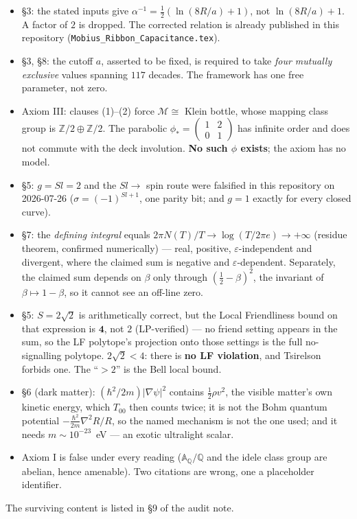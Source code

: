 \documentclass[11pt, a4paper, twocolumn]{article}
\theoremstyle{plain}
\theoremstyle{definition}
\begin{document}
\begin{tcolorbox}[colback=red!4!white, colframe=red!60!black, breakable,
  title=\textbf{Archival status --- read before citing}]
\begin{itemize}\itemsep2pt
\item \S3: the stated inputs give $\alpha^{-1} = \tfrac12(\ln(8R/a)+1)$, not
  $\ln(8R/a)+1$. A factor of $2$ is dropped. The corrected relation is already
  published in this repository (\texttt{Mobius\_Ribbon\_Capacitance.tex}).
\item \S3, \S8: the cutoff $a$, asserted to be fixed, is required to take
  \emph{four mutually exclusive} values spanning $117$ decades. The framework has
  one free parameter, not zero.
\item Axiom III: clauses (1)--(2) force $\mathcal{M}\cong$ Klein bottle, whose
  mapping class group is $\mathbb{Z}/2\oplus\mathbb{Z}/2$. The parabolic
  $\phi_*=\left(\begin{smallmatrix}1&2\\0&1\end{smallmatrix}\right)$ has infinite
  order and does not commute with the deck involution. \textbf{No such $\phi$ exists};
  the axiom has no model.
\item \S5: $g = Sl = 2$ and the $Sl\!\to\!$ spin route were falsified in this
  repository on 2026-07-26 ($\sigma=(-1)^{Sl+1}$, one parity bit; and $g=1$
  exactly for every closed curve).
\item \S7: the \emph{defining integral} equals $2\pi N(T)/T\to\log(T/2\pi e)\to
  +\infty$ (residue theorem, confirmed numerically) --- real, positive,
  $\varepsilon$-independent and divergent, where the claimed sum is negative and
  $\varepsilon$-dependent. Separately, the claimed sum depends on $\beta$ only
  through $(\tfrac12-\beta)^2$, the invariant of $\beta\mapsto1-\beta$, so it cannot
  see an off-line zero.
\item \S5: $S=2\sqrt2$ is arithmetically correct, but the Local Friendliness bound
  on that expression is $\mathbf{4}$, not $2$ (LP-verified) --- no friend setting
  appears in the sum, so the LF polytope's projection onto those settings is the
  full no-signalling polytope. $2\sqrt2<4$: there is \textbf{no LF violation}, and
  Tsirelson forbids one. The ``$>2$'' is the Bell local bound.
\item \S6 (dark matter): $(\hbar^2/2m)|\nabla\psi|^2$ contains
  $\tfrac12\rho v^2$, the visible matter's own kinetic energy, which
  $T_{00}$ then counts twice; it is not the Bohm quantum potential
  $-\tfrac{\hbar^2}{2m}\nabla^2R/R$, so the named mechanism is not the one used;
  and it needs $m\sim10^{-23}$~eV --- an exotic ultralight scalar.
\item Axiom I is false under every reading ($\mathbb{A}_\mathbb{Q}/\mathbb{Q}$
  and the idele class group are abelian, hence amenable). Two citations are
  wrong, one a placeholder identifier.
\end{itemize}
The surviving content is listed in \S9 of the audit note.
\end{tcolorbox}
\end{document}
